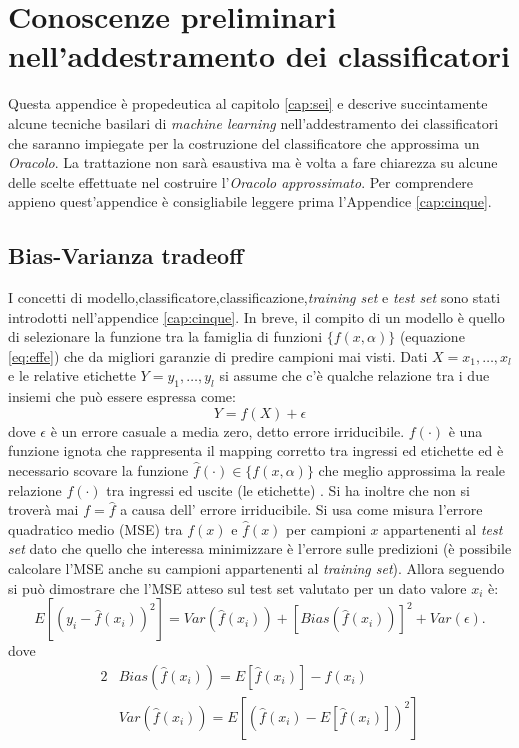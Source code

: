  
 
 
 
 
 
 
 
 \chapter[Prel. add.  class.]{Conoscenze preliminari nell'addestramento dei classificatori}
\label{app:tre}
Questa appendice è propedeutica al capitolo \ref{cap:sei} e descrive succintamente alcune tecniche basilari di \textit{machine learning}  nell'addestramento dei classificatori che saranno impiegate per la costruzione del classificatore che approssima un \textit{Oracolo}. La trattazione non sarà esaustiva ma è volta a fare chiarezza su alcune delle scelte effettuate nel costruire l'\textit{Oracolo approssimato}. Per comprendere appieno quest'appendice è consigliabile leggere prima l'Appendice \ref{cap:cinque}.

\section{Bias-Varianza tradeoff}
I concetti di modello,classificatore,classificazione,\textit{training set} e \textit{test set} sono stati introdotti nell'appendice \ref{cap:cinque}. In breve,  il compito di un modello è quello di selezionare la funzione tra la famiglia di funzioni $\{f(x,\alpha)\}$ (equazione \eqref{eq:effe}) che da migliori garanzie di predire campioni mai visti. Dati $X=x_1,\dots,x_l$ e le relative etichette $Y=y_1,\dots,y_l$ si assume che c'è qualche relazione tra i due insiemi che può essere espressa come:
\begin{equation}
Y = f(X) + \epsilon
\end{equation}
dove $\epsilon$ è un errore casuale a media zero, detto errore irriducibile.
$f(\cdot)$ è una funzione ignota che rappresenta il mapping corretto tra ingressi ed etichette ed è necessario scovare la funzione $\hat{f}(\cdot) \in \{f(x,\alpha)\}$ che meglio approssima la reale relazione $f(\cdot)$ tra ingressi ed uscite (le etichette) . Si ha inoltre che non si troverà mai $f=\hat{f}$ a causa dell' errore irriducibile. Si usa come misura l'errore quadratico medio (MSE) tra $f(x) \text{ e }\hat{f}(x)$ per campioni $x$ appartenenti al \textit{test set} dato che quello che interessa minimizzare è l'errore sulle predizioni (è possibile calcolare l'MSE anche su campioni appartenenti al \textit{training set}). Allora seguendo \cite{Trevor09} si può dimostrare che l'MSE atteso sul test set valutato per un dato valore $x_i$ è:
\begin{equation}
E[( y_i − \hat{f}(x_i) )^2] = Var( \hat{f}(x_i)) + [Bias( \hat{f}(x_i))]^2 + Var(\epsilon). 
\end{equation}  
 dove 
 \begin{alignat*}{2}
&Bias( \hat{f}(x_i)) = E[\hat{f}(x_i)] - f(x_i) \\
 &Var( \hat{f}(x_i)) = E[(\hat{f}(x_i) - E[\hat{f}(x_i)])^2]
\end{alignat*}

